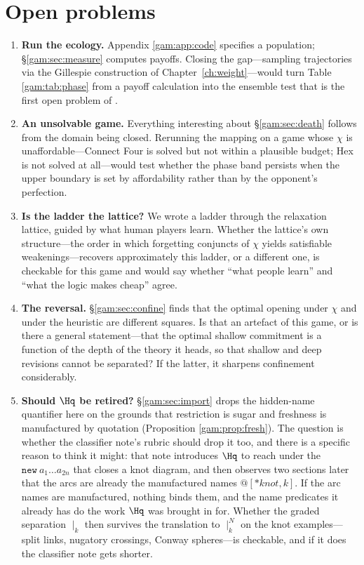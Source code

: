 \section{Open problems}\label{gam:S12}

\begin{enumerate}
\item \textbf{Run the ecology.} Appendix \ref{gam:app:code} specifies a population;
\S\ref{gam:sec:measure} computes payoffs. Closing the gap---sampling trajectories
via the Gillespie construction of Chapter~\ref{ch:weight}---would turn Table
\ref{gam:tab:phase} from a payoff calculation into the ensemble test that is the
first open problem of \chSci.

\item \textbf{An unsolvable game.} Everything interesting about
\S\ref{gam:sec:death} follows from the domain being closed. Rerunning the mapping on
a game whose $\chi$ is unaffordable---Connect Four is solved but not within a
plausible budget; Hex is not solved at all---would test whether the phase band
persists when the upper boundary is set by affordability rather than by the
opponent's perfection.

\item \textbf{Is the ladder the lattice?} We wrote a ladder through the
relaxation lattice, guided by what human players learn. Whether the lattice's own
structure---the order in which forgetting conjuncts of $\chi$ yields satisfiable
weakenings---recovers approximately this ladder, or a different one, is
checkable for this game and would say whether ``what people learn'' and ``what
the logic makes cheap'' agree.

\item \textbf{The reversal.} \S\ref{gam:sec:confine} finds that the optimal opening
under $\chi$ and under the heuristic are different squares. Is that an artefact
of this game, or is there a general statement---that the optimal shallow
commitment is a function of the depth of the theory it heads, so that shallow
and deep revisions cannot be separated? If the latter, it sharpens confinement
considerably.

\item \textbf{Should $\Hq$ be retired?} \S\ref{gam:sec:import} drops the hidden-name
quantifier here on the grounds that restriction is sugar and freshness is
manufactured by quotation (Proposition \ref{gam:prop:fresh}). The question is
whether the classifier note's rubric should drop it too, and there is a specific
reason to think it might: that note introduces $\Hq$ to reach under the
$\texttt{new}\ a_1 \dots a_{2n}$ that closes a knot diagram, and then observes
two sections later that the arcs are already the manufactured names
$@[*\mathit{knot},k]$. If the arc names are manufactured, nothing binds them,
and the name predicates it already has do the work $\Hq$ was brought in for.
Whether the graded separation $\mid_k$ then survives the translation to
$\mid_k^N$ on the knot examples---split links, nugatory crossings, Conway
spheres---is checkable, and if it does the classifier note gets shorter.


\end{enumerate}
